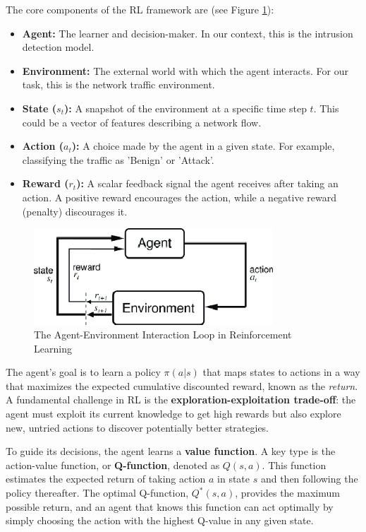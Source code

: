 \documentclass[12pt]{report}
\begin{document}
The core components of the RL framework are (see Figure \ref{fig:rl-diagram}):
\begin{itemize}
    \item \textbf{Agent:} The learner and decision-maker. In our context, this is the intrusion detection model.
    \item \textbf{Environment:} The external world with which the agent interacts. For our task, this is the network traffic environment.
    \item \textbf{State ($s_t$):} A snapshot of the environment at a specific time step $t$. This could be a vector of features describing a network flow.
    \item \textbf{Action ($a_t$):} A choice made by the agent in a given state. For example, classifying the traffic as 'Benign' or 'Attack'.
    \item \textbf{Reward ($r_t$):} A scalar feedback signal the agent receives after taking an action. A positive reward encourages the action, while a negative reward (penalty) discourages it.
\end{itemize}

\begin{figure}[H]
    \centering
    \includegraphics[width=0.8\textwidth]{images/rl-diagram.png}
    \caption{The Agent-Environment Interaction Loop in Reinforcement Learning}
    \label{fig:rl-diagram}
\end{figure}

The agent's goal is to learn a policy $\pi(a|s)$ that maps states to actions in a way that maximizes the expected cumulative discounted reward, known as the \textit{return}. A fundamental challenge in RL is the \textbf{exploration-exploitation trade-off}: the agent must exploit its current knowledge to get high rewards but also explore new, untried actions to discover potentially better strategies.

To guide its decisions, the agent learns a \textbf{value function}. A key type is the action-value function, or \textbf{Q-function}, denoted as $Q(s, a)$. This function estimates the expected return of taking action $a$ in state $s$ and then following the policy thereafter. The optimal Q-function, $Q^*(s, a)$, provides the maximum possible return, and an agent that knows this function can act optimally by simply choosing the action with the highest Q-value in any given state.
\end{document}
